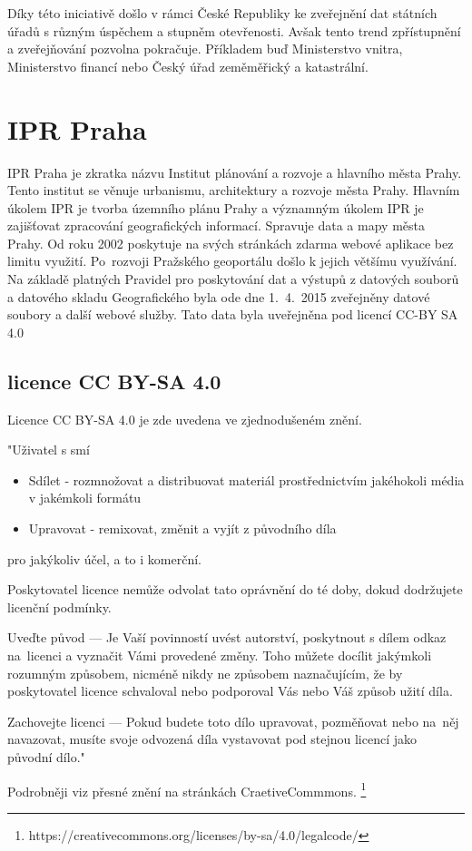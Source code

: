 Díky této iniciativě došlo v rámci České Republiky ke zveřejnění
dat státních úřadů s různým úspěchem a stupněm otevřenosti.
Avšak tento trend zpřístupnění a zveřejňování pozvolna pokračuje.
Příkladem buď Ministerstvo vnitra, Ministerstvo financí nebo Český úřad zeměměřický a katastrální.


\section{IPR Praha}
\label{IPR Praha}
IPR Praha je zkratka názvu Institut plánování a rozvoje a hlavního města Prahy. 
Tento institut se věnuje urbanismu, architektury a rozvoje města Prahy. Hlavním
úkolem IPR je tvorba územního plánu Prahy a významným úkolem IPR je zajišťovat
zpracování geografických informací. Spravuje data a mapy města Prahy. Od roku 
2002 poskytuje na svých stránkách zdarma webové aplikace bez limitu využití. 
Po~rozvoji Pražského geoportálu došlo k jejich většímu využívání. Na základě 
platných Pravidel pro poskytování dat a výstupů z datových souborů a datového 
skladu Geografického byla ode dne 1.~4.~2015 zveřejněny datové soubory a další 
webové služby. Tato data byla uveřejněna pod licencí CC-BY SA 4.0 \cite{IPR}
\subsection{licence CC BY-SA 4.0}
\label{licence CC BY-SA 4.0}
Licence CC BY-SA 4.0 je zde uvedena ve zjednodušeném znění.

"Uživatel s smí
\begin{itemize}
    \item   Sdílet - rozmnožovat a distribuovat materiál prostřednictvím jakéhokoli média v jakémkoli formátu
    \item   Upravovat - remixovat, změnit a vyjít z původního díla
\end{itemize}
pro jakýkoliv účel, a to i komerční.

Poskytovatel licence nemůže odvolat tato oprávnění do té doby, dokud dodržujete licenční podmínky.

Uveďte původ — Je Vaší povinností uvést autorství, poskytnout s dílem odkaz
na~licenci a vyznačit Vámi provedené změny. Toho můžete docílit jakýmkoli
rozumným způsobem, nicméně nikdy ne způsobem naznačujícím, že by poskytovatel
licence schvaloval nebo podporoval Vás nebo Váš způsob užití díla.

Zachovejte licenci — Pokud budete toto dílo upravovat, pozměňovat nebo
na~něj navazovat, musíte svoje odvozená díla vystavovat pod stejnou
licencí jako původní dílo."

Podrobněji viz přesné znění na stránkách CraetiveCommmons.
\footnote{https://creativecommons.org/licenses/by-sa/4.0/legalcode/}
